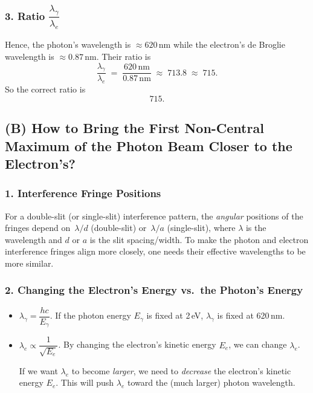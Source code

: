 \documentclass[12pt]{article}
\theoremstyle{definition} %
\theoremstyle{plain} %
\begin{document}
\subsubsection*{3. Ratio \(\dfrac{\lambda_{\gamma}}{\lambda_{e}}\)}

Hence, the photon's wavelength is \(\approx 620\,\text{nm}\) while the electron's de Broglie wavelength is \(\approx 0.87\,\text{nm}\). Their ratio is
\[
\frac{\lambda_{\gamma}}{\lambda_{e}}
\;=\;
\frac{620\,\text{nm}}{0.87\,\text{nm}}
\;\approx\;
713.8
\;\approx\;
715.
\]
So the correct ratio is 
\[
\boxed{715}.
\]

\subsection*{(B) How to Bring the First Non-Central Maximum of the Photon Beam Closer to the Electron's?}

\subsubsection*{1. Interference Fringe Positions}

For a double-slit (or single-slit) interference pattern, the \emph{angular} positions of the fringes depend on 
\(\,\lambda/d\) (double-slit) or \(\,\lambda/a\) (single-slit), where \(\lambda\) is the wavelength and \(d\) or \(a\) is the slit spacing/width. 
To make the photon and electron interference fringes align more closely, one needs their effective wavelengths to be more similar.

\subsubsection*{2. Changing the Electron's Energy vs.\ the Photon's Energy}

\begin{itemize}
\item \(\lambda_{\gamma} = \dfrac{hc}{E_{\gamma}}\). If the photon energy \(E_{\gamma}\) is fixed at 2\,eV, \(\lambda_{\gamma}\) is fixed at 620\,nm.
\item \(\lambda_{e} \propto \dfrac{1}{\sqrt{E_{e}}}\). By changing the electron's kinetic energy \(E_{e}\), we can change \(\lambda_{e}\).

If we want \(\lambda_e\) to become \emph{larger}, we need to \emph{decrease} the electron's kinetic energy \(E_{e}\). This will push \(\lambda_e\) toward the (much larger) photon wavelength. 
\end{itemize}
\end{document}
